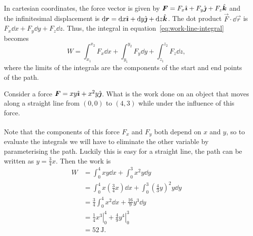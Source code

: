 \documentclass[../classical_mechanics.tex]{subfiles}
\begin{document}
        \paragraph{}
        In cartesian coordinates, the force vector is given by $\boldsymbol{F}=F_x\hat{\boldsymbol{\imath}}+F_y\hat{\boldsymbol{\jmath}}+F_z\hat{\boldsymbol{k}}$ and the infinitesimal displacement is $\dd{\vec{r}}=\dd{x}\ihat+\dd{y}\jhat+\dd{z}\khat$.
        The dot product $\vec{F}\cdot\dd{\vec{r}}$ is $F_x\dd{x}+F_y\dd{y}+F_z\dd{z}$.
        Thus, the integral in equation~\ref{eq:work-line-integral} becomes
        \begin{equation}
            W=\int_{x_1}^{x_2}F_x\dd{x}+\int_{y_1}^{y_2}F_y\dd{y}+\int_{z_1}^{z_2}F_z\dd{z},
        \end{equation}
        where the limits of the integrals are the components of the start and end points of the path.
        \begin{example}\label{ex:work-cartesian}
            Consider a force $\boldsymbol{F}=xy\hat{\boldsymbol{\imath}}+x^2y\hat{\boldsymbol{\jmath}}$.
            What is the work done on an object that moves along a straight line from $(0,0)$ to $(4,3)$ while under the influence of this force.

            \paragraph{}
            Note that the components of this force $F_x$ and $F_y$ both depend on $x$ and $y$, so to evaluate the integrals we will have to eliminate the other variable by parameterising the path.
            Luckily this is easy for a straight line, the path can be written as $y=\frac{3}{4}x$.
            Then the work is
            \begin{align}
                W&=\int_0^4 xy\dd{x}+\int_0^3x^2y\dd{y}\\
                &=\int_0^4 x\left(\frac{3}{4}x\right)\dd{x}+\int_0^3\left(\frac{4}{3}y\right)^2y\dd{y}\\
                &=\frac{3}{4}\int_0^4x^2\dd{x}+\frac{16}{9}y^3\dd{y}\\
                &=\left.\frac{1}{4}x^3\right|_0^4+\left.\frac{4}{9}y^4\right|_0^3\\
                &=\qty{52}{\joule}.
            \end{align}
        \end{example}
        
\end{document}
